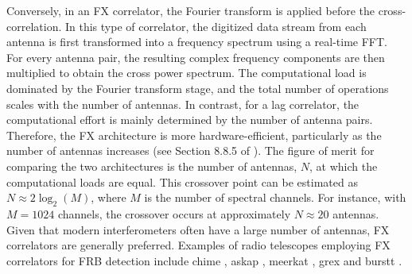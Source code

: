 Conversely, in an FX correlator, the Fourier transform is applied before the cross-correlation. In this type of correlator, the digitized data stream from each antenna is first transformed into a frequency spectrum using a real-time FFT. For every antenna pair, the resulting complex frequency components are then multiplied to obtain the cross power spectrum. The computational load is dominated by the Fourier transform stage, and the total number of operations scales with the number of antennas. In contrast, for a lag correlator, the computational effort is mainly determined by the number of antenna pairs. Therefore, the FX architecture is more hardware-efficient, particularly as the number of antennas increases (see Section 8.8.5 of \citealt{thompson2017interferometry}). The figure of merit for comparing the two architectures is the number of antennas, $N$, at which the computational loads are equal. This crossover point can be estimated as $N \approx 2 \log_2(M)$, where $M$ is the number of spectral channels. For instance, with $M = 1024$ channels, the crossover occurs at approximately $N \approx 20$ antennas. Given that modern interferometers often have a large number of antennas, FX correlators are generally preferred.
Examples of radio telescopes employing FX correlators for FRB detection include \gls{chime} \citep{CHIME/FRB_2018}, \gls{askap} \citep{Shannon_2025}, \gls{meerkat} \citep{MeerKAT}, \gls{grex} \citep{GReX} and \gls{burstt} \citep{BURSTT}.

